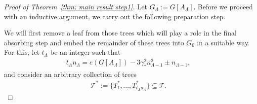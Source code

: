 \documentclass[a4paper, 11pt, reqno]{amsart}
\numberwithin{equation}{section}
\newcommand{\1}{{\rm 1\hspace*{-0.4ex}%
\rule{0.1ex}{1.52ex}\hspace*{0.2ex}}}
\newcommand{\cT}{\mathcal{T}}
\newcounter{step}
\begin{document}
\begin{proof}[Proof of Theorem~\ref{thm: main result step1}]
Let $G_{\Lambda}:=G[A_{\Lambda}]$.
Before we proceed with an inductive argument, we carry out the following preparation step. \newline

We will first remove a leaf from those trees which will play a role in the final absorbing step and
embed the remainder of these trees into $G_0$ in a suitable way.
For this, let $t_{\Lambda}$ be an integer such that 
\begin{align}\label{eq:edgesGlast}
	t_{\Lambda} n_{\Lambda} = e(G[A_{\Lambda}])- 3\gamma_*^2 n_{\Lambda-1}^2 \pm n_{\Lambda-1},
\end{align}
and consider an arbitrary collection of trees 
\begin{align}\label{eq:laststeptrees}
	\cT^*:= \{ T^*_1,\dots, T^*_{t_{\Lambda}n_{\Lambda}}\} \subseteq \cT.
\end{align}


\end{proof}
\end{document}
